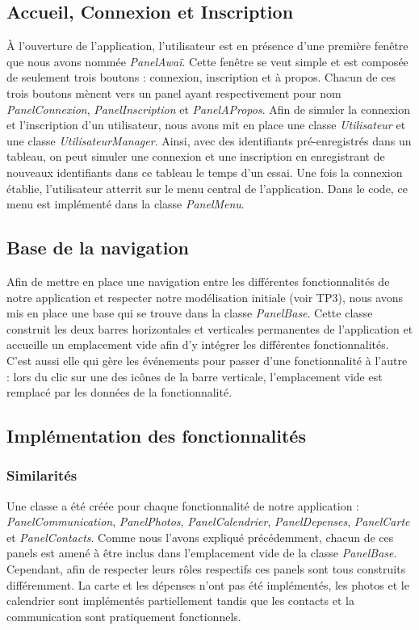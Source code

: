 \documentclass[11pt]{article}
\begin{document}
\subsection{Accueil, Connexion et Inscription}
À l'ouverture de l'application, l'utilisateur est en présence d'une première fenêtre que nous avons nommée \textit{PanelAwaï}. Cette fenêtre se veut simple et est composée de seulement trois boutons : connexion, inscription et à propos. Chacun de ces trois boutons mènent vers un panel ayant respectivement pour nom \textit{PanelConnexion}, \textit{PanelInscription} et \textit{PanelAPropos}. Afin de simuler la connexion et l'inscription d'un utilisateur, nous avons mit en place une classe \textit{Utilisateur} et une classe \textit{UtilisateurManager}. Ainsi, avec des identifiants pré-enregistrés dans un tableau, on peut simuler une connexion et une inscription en enregistrant de nouveaux identifiants dans ce tableau le temps d'un essai. Une fois la connexion établie, l'utilisateur atterrit sur le menu central de l'application. Dans le code, ce menu est implémenté dans la classe \textit{PanelMenu}.

\subsection{Base de la navigation}
Afin de mettre en place une navigation entre les différentes fonctionnalités de notre application et respecter notre modélisation initiale (voir TP3), nous avons mis en place une base qui se trouve dans la classe \textit{PanelBase}. Cette classe construit les deux barres horizontales et verticales permanentes de l'application et accueille un emplacement vide afin d'y intégrer les différentes fonctionnalités. C'est aussi elle qui gère les événements pour passer d'une fonctionnalité à l'autre : lors du clic sur une des icônes de la barre verticale, l'emplacement vide est remplacé par les données de la fonctionnalité.

\subsection{Implémentation des fonctionnalités}
\subsubsection{Similarités}
Une classe a été créée pour chaque fonctionnalité de notre application : \textit{PanelCommunication}, \textit{PanelPhotos}, \textit{PanelCalendrier}, \textit{PanelDepenses}, \textit{PanelCarte} et \textit{PanelContacts}. Comme nous l'avons expliqué précédemment, chacun de ces panels est amené à être inclus dans l'emplacement vide de la classe \textit{PanelBase}. Cependant, afin de respecter leurs rôles respectifs ces panels sont tous construits différemment. La carte et les dépenses n'ont pas été implémentés, les photos et le calendrier sont implémentés partiellement tandis que les contacts et la communication sont pratiquement fonctionnels.
\end{document}
